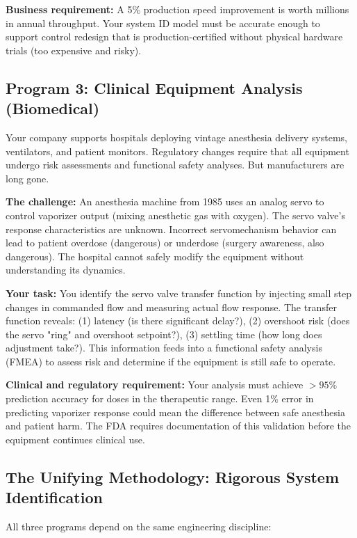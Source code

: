 \documentclass[11pt,letterpaper]{article}
\begin{document}
\textbf{Business requirement:} A 5\% production speed improvement is worth millions in annual throughput. Your system ID model must be accurate enough to support control redesign that is production-certified without physical hardware trials (too expensive and risky).

\subsection{Program 3: Clinical Equipment Analysis (Biomedical)}

Your company supports hospitals deploying vintage anesthesia delivery systems, ventilators, and patient monitors. Regulatory changes require that all equipment undergo risk assessments and functional safety analyses. But manufacturers are long gone.

\textbf{The challenge:} An anesthesia machine from 1985 uses an analog servo to control vaporizer output (mixing anesthetic gas with oxygen). The servo valve's response characteristics are unknown. Incorrect servomechanism behavior can lead to patient overdose (dangerous) or underdose (surgery awareness, also dangerous). The hospital cannot safely modify the equipment without understanding its dynamics.

\textbf{Your task:} You identify the servo valve transfer function by injecting small step changes in commanded flow and measuring actual flow response. The transfer function reveals: (1) latency (is there significant delay?), (2) overshoot risk (does the servo "ring" and overshoot setpoint?), (3) settling time (how long does adjustment take?). This information feeds into a functional safety analysis (FMEA) to assess risk and determine if the equipment is still safe to operate.

\textbf{Clinical and regulatory requirement:} Your analysis must achieve $> 95\%$ prediction accuracy for doses in the therapeutic range. Even 1\% error in predicting vaporizer response could mean the difference between safe anesthesia and patient harm. The FDA requires documentation of this validation before the equipment continues clinical use.

\subsection{The Unifying Methodology: Rigorous System Identification}

All three programs depend on the same engineering discipline:
\end{document}

